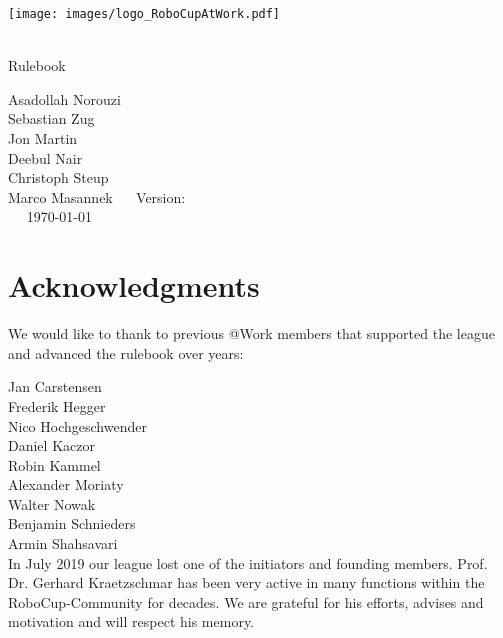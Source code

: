 
\begin{titlepage}
  \begin{center}
    {

      \texttt{[image: images/logo\_RoboCupAtWork.pdf]}\\[1.23ex]
    }
    \vspace{2.7 cm}
    \hrulefill\par
    {%
      \vspace*{.27cm}
      \Huge{\RCAW}\\[1.23ex]
      \Large Rulebook \\[2ex]
    }

    \hrulefill\par


    \vfill
    Asadollah Norouzi\\
  	Sebastian Zug\\
    Jon Martin \\
    Deebul Nair \\
    Christoph Steup \\
    Marco Masannek
    \vfill
    ~~ Version: \YEAR ~~ \\
    ~~  \today ~~ \\
  \end{center}

\newpage

\section*{Acknowledgments}

We would like to thank to previous @Work members that supported the league and
advanced the rulebook over years:

Jan Carstensen \\
Frederik Hegger\\
Nico Hochgeschwender \\
Daniel Kaczor \\
Robin Kammel \\
Alexander Moriaty \\
Walter Nowak \\
Benjamin Schnieders\\
Armin Shahsavari \\

In July 2019 our league lost one of the initiators and founding members. Prof. Dr. Gerhard
Kraetzschmar has been very active in many functions within the RoboCup-Community
for decades. We are grateful for his efforts, advises and motivation and will respect his memory.


\end{titlepage}

